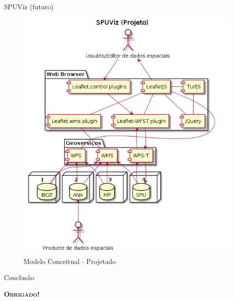 \documentclass[9pt,ignorenonframetext,]{beamer}
\newif\ifbibliography
\begin{document}
\begin{frame}{SPUViz (futuro)}
\protect\hypertarget{spuviz-futuro}{}

\begin{figure}[H]

{\centering \includegraphics[width=0.6\linewidth]{images/modeloConceitual_Futuro} 

}

\caption{Modelo Conceitual - Projetado}\label{fig:unnamed-chunk-13}
\end{figure}

\end{frame}

\begin{frame}{Conclusão}
\protect\hypertarget{conclusuxe3o}{}

\Huge\center \textsc\textbf{Obrigado!}

\end{frame}


  \begin{frame}[allowframebreaks]{}
  \bibliographytrue
  \printbibliography[heading=none]
  \end{frame}
\end{document}
